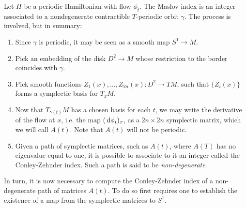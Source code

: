 Let $H$ be a periodic Hamiltonian with flow $\phi_t$. The Maslov index is an integer associated to a nondegenerate contractible $T$-periodic orbit $\gamma$. The process is involved, but in summary:
\begin{enumerate}[algorithm]\label{page:maslovalg}
\item\label{maslovalg:step1} Since $\gamma$ is periodic, it may be seen as a smooth map $S^1 \to M$.
\item Pick an embedding of the disk $D^2 \to M$ whose restriction to the border coincides with $\gamma$.
\item Pick smooth functions $Z_1(x), \dots, Z_{2n}(x) \colon D^2 \to TM$, such that $\{Z_i(x)\}$ forms a symplectic basis for $T_x M$.
\item Now that $T_{\gamma(t)} M$ has a chosen basis for each $t$, we may write the derivative of the flow at $x$, i.e. the map $(\dl \phi_t)_x$, as a $2n \times 2n$ symplectic matrix, which we will call $A(t)$. Note that $A(t)$ will not be periodic.
\item\label{maslovalg:step5} Given a path of symplectic matrices, such as $A(t)$, where $A(T)$ has no eigenvalue equal to one, it is possible to associate to it an integer called the Conley-Zehnder index. Such a path is said to be \emph{non-degenerate}.
\end{enumerate}

In turn, it is now necessary to compute the Conley-Zehnder index of a non-degenerate path of matrices $A(t)$. To do so first requires one to establish the existence of a map from the symplectic matrices to $S^1$.

